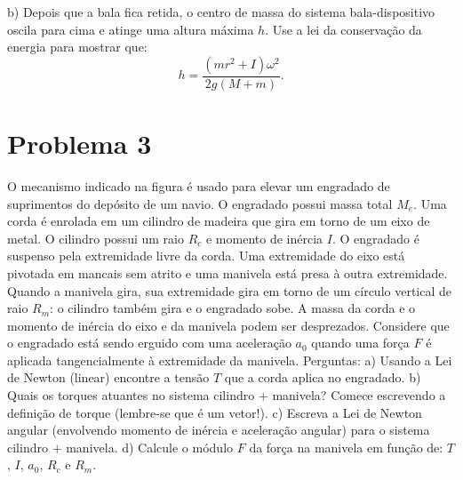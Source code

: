 \documentclass[a4paper, 11pt]{article}
\begin{document}
b) Depois que a bala fica retida, o centro de massa do sistema bala-dispositivo oscila para cima e atinge uma altura máxima $h$. Use a lei da conservação da energia para mostrar que:
\begin{equation}
h=\dfrac{(mr^2+I)\omega^2}{2g(M+m)}. \nonumber
\end{equation} 


\section*{Problema 3}
O mecanismo indicado na figura é usado para elevar um engradado de suprimentos do depósito de um navio. O engradado possui massa total $M_e$. Uma corda é enrolada em um cilindro de madeira que gira em torno de um eixo de metal. O cilindro possui um raio $R_c$ e momento de inércia $I$. O engradado é suspenso pela extremidade livre da corda. Uma extremidade do eixo está pivotada em mancais sem atrito e uma manivela está presa à outra extremidade. Quando a manivela gira, sua extremidade gira em torno de um círculo vertical de raio $R_m$: o cilindro também gira e o engradado sobe. A massa da corda e o momento de inércia do eixo e da manivela podem ser desprezados. Considere que o engradado está sendo erguido com uma aceleração $a_0$ quando uma força $F$ é aplicada tangencialmente à extremidade da manivela. Perguntas:
a) Usando a Lei de Newton (linear) encontre a tensão $T$ que a corda aplica no engradado.
b) Quais os torques atuantes no sistema cilindro $+$ manivela? Comece escrevendo a definição de torque (lembre-se que é um vetor!).
c) Escreva a Lei de Newton angular (envolvendo momento de inércia e aceleração angular) para o sistema cilindro $+$ manivela.
d) Calcule o módulo $F$ da força na manivela em função de: $T$, $I$, $a_0$, $R_c$ e $R_m$.
\end{document}
